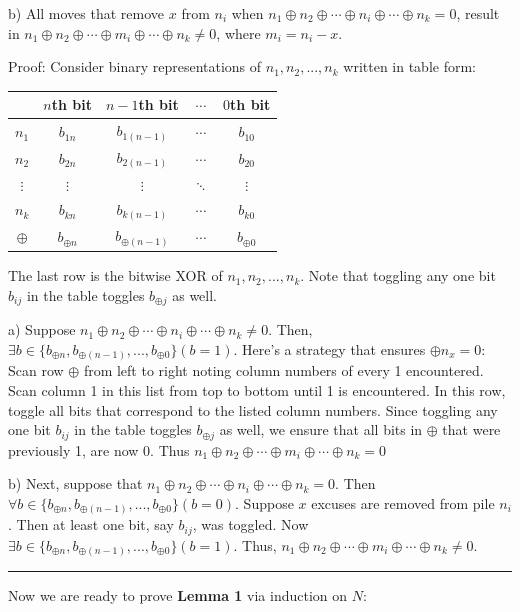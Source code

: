\documentclass[addpoints]{exam}
\begin{document}
\begin{questions}
\begin{solution}
b) All moves that remove $x$ from $n_i$ when $n_1 \oplus n_2 \oplus \cdots \oplus n_i \oplus \cdots \oplus n_k = 0$, result in $n_1 \oplus n_2 \oplus \cdots \oplus m_i \oplus \cdots \oplus n_k \not = 0$, where $m_i = n_i - x$.

Proof: Consider binary representations of $n_1,n_2,...,n_k$ written in table form:
\begin{center}

\begin{tabular}{c | c  c  c  c}
	& $n$th bit & $n-1$th bit & $\cdots$ & $0$th bit\\
	\hline
	$n_1$ & $b_{1n}$ & $b_{1(n-1)}$ & $\cdots$ & $b_{10}$\\
	$n_2$ & $b_{2n}$ & $b_{2(n-1)}$ & $\cdots$ & $b_{20}$\\
	$\vdots$ & $\vdots$ & $\vdots$ & $\ddots$ & $\vdots$\\ 
	$n_k$ & $b_{kn}$ & $b_{k(n-1)}$ & $\cdots$ & $b_{k0}$\\
	\hline
	$\oplus$ & $b_{\oplus n}$ & $b_{\oplus(n-1)}$ & $\cdots$ & $b_{\oplus 0}$\\
	 
\end{tabular}

\end{center}

The last row is the bitwise XOR of $n_1,n_2,...,n_k$. Note that toggling any one bit $b_{ij}$ in the table toggles $b_{\oplus j}$ as well.  

a) Suppose $n_1 \oplus n_2 \oplus \cdots \oplus n_i \oplus \cdots \oplus n_k \not = 0$. Then, $\exists b \in \{b_{\oplus n},b_{\oplus (n-1)},...,b_{\oplus 0}\}(b = 1)$. Here's a strategy that ensures $\oplus n_x = 0$: Scan row $\oplus$ from left to right noting column numbers of every 1 encountered. Scan column 1 in this list from top to bottom until 1 is encountered. In this row, toggle all bits that correspond to the listed column numbers. Since toggling any one bit $b_{ij}$ in the table toggles $b_{\oplus j}$ as well, we ensure that all bits in $\oplus$ that were previously 1, are now 0. Thus $n_1 \oplus n_2 \oplus \cdots \oplus m_i \oplus \cdots \oplus n_k = 0$

b) Next, suppose that $n_1 \oplus n_2 \oplus \cdots \oplus n_i \oplus \cdots \oplus n_k = 0$. Then $\forall b \in \{b_{\oplus n},b_{\oplus (n-1)},...,b_{\oplus 0}\}(b = 0)$. Suppose $x$ excuses are removed from pile $n_i$. Then at least one bit, say $b_{ij}$, was toggled. Now $\exists b \in \{b_{\oplus n},b_{\oplus (n-1)},...,b_{\oplus 0}\}(b = 1)$. Thus, $n_1 \oplus n_2 \oplus \cdots \oplus m_i \oplus \cdots \oplus n_k \not = 0$.\\
\hrule
Now we are ready to prove \textbf{Lemma 1} via induction on $N$:


\end{solution}
\end{questions}
\end{document}
